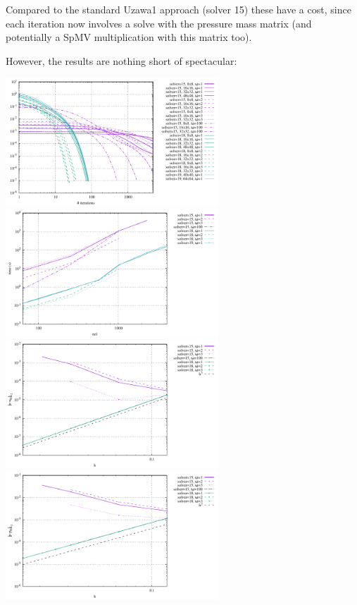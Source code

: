Compared to the standard Uzawa1 approach (solver 15) these have a cost, 
since each iteration now involves a solve with the pressure mass matrix 
(and potentially a SpMV multiplication with this matrix too). 

However, the results are nothing short of spectacular:

\begin{center}
\includegraphics[width=8cm]{python_codes/fieldstone_147/RESULTS/L2/uzawa1/solver_convergence.pdf}
\includegraphics[width=8cm]{python_codes/fieldstone_147/RESULTS/L2/uzawa1/time.pdf}\\
\includegraphics[width=8cm]{python_codes/fieldstone_147/RESULTS/L2/uzawa1/errorsV.pdf}
\includegraphics[width=8cm]{python_codes/fieldstone_147/RESULTS/L2/uzawa1/errorsP.pdf}
\end{center}

